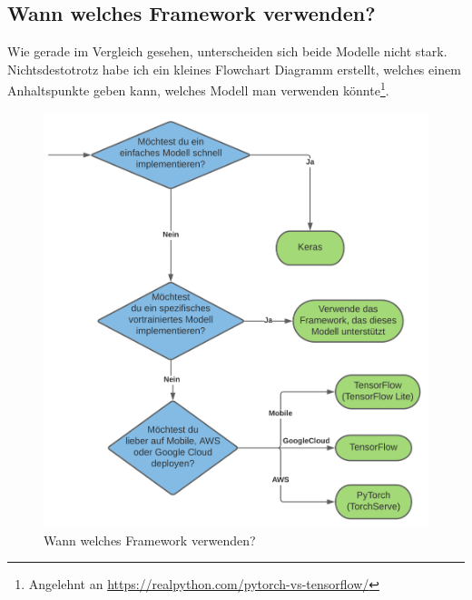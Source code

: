 \newpage

\subsection{Wann welches Framework verwenden?}

Wie gerade im Vergleich gesehen, unterscheiden sich beide Modelle nicht stark. Nichtsdestotrotz habe ich ein kleines Flowchart Diagramm erstellt, 
welches einem Anhaltspunkte geben kann, welches Modell man verwenden könnte\footnote{Angelehnt an \url{https://realpython.com/pytorch-vs-tensorflow/}}.

\begin{figure}[htbp]
    \centering
    \includegraphics[width=.9\textwidth]{figures/decision-tree}
    \caption{Wann welches Framework verwenden?}
    \label{fig:decision-tree}
\end{figure}